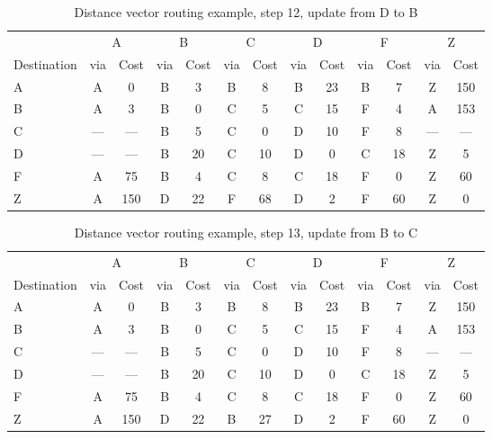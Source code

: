 \begin{table}
    \caption{Distance vector  routing example, step 12, update from D to B }
    \label{tab:dv:step:12}
\begin{tabular}{l|c|c|c|c|c|c|c|c|c|c|c|c}
    \toprule
      & \multicolumn{2}{c|}{A}&\multicolumn{2}{c|}{B}&\multicolumn{2}{c|}{C}&\multicolumn{2}{c|}{D}&\multicolumn{2}{c|}{F}&\multicolumn{2}{c|}{Z} \\
    Destination & via&Cost&via&Cost&via&Cost&via&Cost&via&Cost&via&Cost \\ 
    \midrule
    A & A & 0 &B & 3 &B & 8 &B & 23 &B & 7 &Z & 150 
 \\B & A & 3 &B & 0 &C & 5 &C & 15 &F & 4 &A & 153 
 \\C & --- & ---&B & 5 &C & 0 &D & 10 &F & 8 &--- & ---
 \\D & --- & ---&B & 20 &C & 10 &D & 0 &C & 18 &Z & 5 
 \\F & A & 75 &B & 4 &C & 8 &C & 18 &F & 0 &Z & 60 
 \\Z & A & 150 &D & 22 &F & 68 &D & 2 &F & 60 &Z & 0 
    \\ \bottomrule 
\end{tabular}
\end{table}
    

\begin{table}
    \caption{Distance vector  routing example, step 13, update from B to C }
    \label{tab:dv:step:13}
\begin{tabular}{l|c|c|c|c|c|c|c|c|c|c|c|c}
    \toprule
      & \multicolumn{2}{c|}{A}&\multicolumn{2}{c|}{B}&\multicolumn{2}{c|}{C}&\multicolumn{2}{c|}{D}&\multicolumn{2}{c|}{F}&\multicolumn{2}{c|}{Z} \\
    Destination & via&Cost&via&Cost&via&Cost&via&Cost&via&Cost&via&Cost \\ 
    \midrule
    A & A & 0 &B & 3 &B & 8 &B & 23 &B & 7 &Z & 150 
 \\B & A & 3 &B & 0 &C & 5 &C & 15 &F & 4 &A & 153 
 \\C & --- & ---&B & 5 &C & 0 &D & 10 &F & 8 &--- & ---
 \\D & --- & ---&B & 20 &C & 10 &D & 0 &C & 18 &Z & 5 
 \\F & A & 75 &B & 4 &C & 8 &C & 18 &F & 0 &Z & 60 
 \\Z & A & 150 &D & 22 &B & 27 &D & 2 &F & 60 &Z & 0 
    \\ \bottomrule 
\end{tabular}
\end{table}
    

